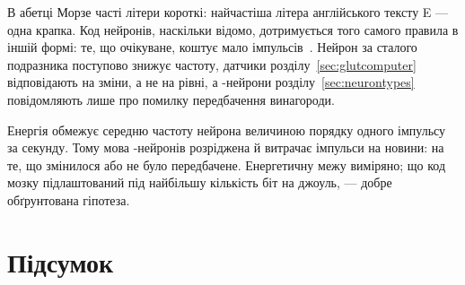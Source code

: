 В абетці Морзе часті літери короткі: найчастіша літера англійського тексту E --- одна крапка. Код нейронів, наскільки відомо, дотримується того самого правила в іншій формі: те, що очікуване, коштує мало імпульсів~\cite{Barlow1961}. Нейрон за сталого подразника поступово знижує частоту, датчики розділу~\ref{sec:glutcomputer} відповідають на зміни, а не на рівні, а -нейрони розділу~\ref{sec:neurontypes} повідомляють лише про помилку передбачення винагороди.

\begin{keyblock}
\begin{proposition}[Ощадливість]
\label{prop:economy}
Енергія обмежує середню частоту нейрона величиною порядку одного імпульсу за секунду. Тому мова -нейронів розріджена й витрачає імпульси на новини: на те, що змінилося або не було передбачене. Енергетичну межу виміряно; що код мозку підлаштований під найбільшу кількість біт на джоуль, --- добре обґрунтована гіпотеза.
\end{proposition}
\end{keyblock}

\section{Підсумок}

